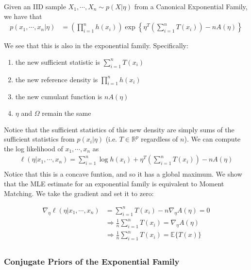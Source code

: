 \documentclass[]{article}
\theoremstyle{mattstyle}
\theoremstyle{definition}
\begin{document}
Given an IID sample $X_1, \cdots, X_n \sim p(X|\eta)$ from a Canonical Exponential Family, we have that
\begin{align*}
p(x_1, \cdots, x_n|\eta) &= \left(\prod_{i=1}^n h(x_i)\right) \exp\left\{ \eta^T\left(\sum_{i=1}^nT(x_i)\right) - nA(\eta)\right\}
\end{align*}

We see that this is also in the exponential family. Specifically:
\begin{enumerate}
	\item the new sufficient statistic is $\sum_{i=1}^nT(x_i)$
	\item the new reference density is $\prod_{i=1}^n h(x_i)$
	\item the new cumulant function is $nA(\eta)$
	\item $\eta$ and $\Omega$ remain the same
\end{enumerate}

Notice that the sufficient statistics of this new density are simply sums of the sufficient statistics from $p(x_i|\eta)$ (i.e. $T \in \mathbb{R}^p$ regardless of $n$). We can compute the log likelihood of $x_1, \cdots, x_n$ as
\begin{align*}
\ell(\eta| x_1, \cdots, x_n) = \sum_{i=1}^n \log h(x_i) +  \eta^T\left(\sum_{i=1}^nT(x_i)\right) - nA(\eta)\\
\end{align*}
Notice that this is a concave funtion, and so it has a global maximum. We show that the MLE estimate for an exponential family is equivalent to Moment Matching. We take the gradient and set it to zero:

\begin{align*}
\nabla_{\eta} \ell(\eta| x_1, \cdots, x_n) &= \sum_{i=1}^nT(x_i) - n\nabla_{\eta} A(\eta) = 0\\
&\Rightarrow \frac{1}{n}\sum_{i=1}^nT(x_i) = \nabla_{\eta}A(\eta)\\
&\Rightarrow \frac{1}{n}\sum_{i=1}^nT(x_i) = \mathbb{E}\{T(x)\}\\
\end{align*} 

\newpage

\subsubsection{Conjugate Priors of the Exponential Family}
\end{document}
